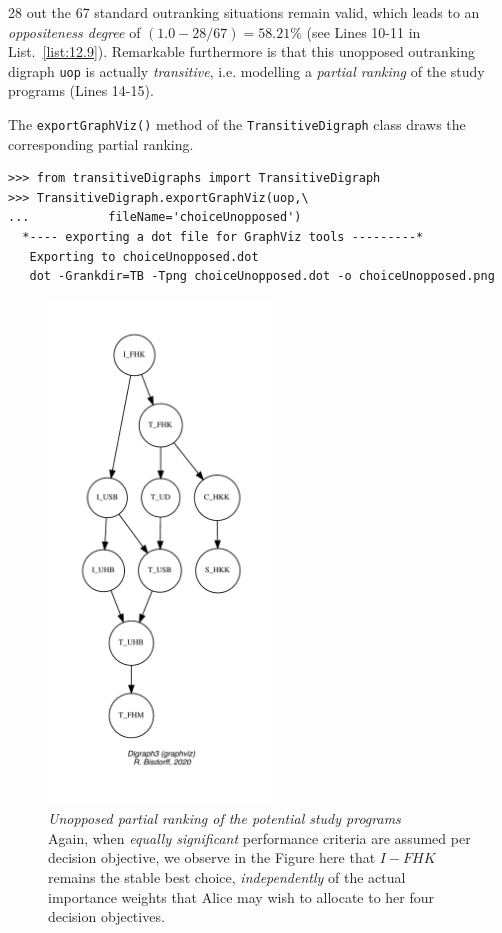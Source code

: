 28 out the 67 standard outranking situations remain valid, which leads to an \emph{oppositeness degree} of $(1.0 - 28/67) = 58.21\%$ (see Lines 10-11 in List.~\vref{list:12.9}). Remarkable furthermore is that this unopposed outranking digraph \texttt{uop} is actually \emph{transitive}, i.e. modelling a \emph{partial ranking} of the study programs (Lines 14-15).

The \texttt{exportGraphViz()} method of the \texttt{Transi\-tiveDigraph} class draws the corresponding partial ranking.
\begin{lstlisting}
>>> from transitiveDigraphs import TransitiveDigraph
>>> TransitiveDigraph.exportGraphViz(uop,\
...           fileName='choiceUnopposed')
  *---- exporting a dot file for GraphViz tools ---------*
   Exporting to choiceUnopposed.dot
   dot -Grankdir=TB -Tpng choiceUnopposed.dot -o choiceUnopposed.png
\end{lstlisting}
\begin{figure}[ht]
\sidecaption[t]
\includegraphics[width=6cm]{Figures/12-7-choiceUnopposed.pdf}
\caption[Unopposed partial ranking of the potential study programs]{\emph{Unopposed partial ranking of the potential study programs}\\ Again, when \emph{equally significant} performance criteria are assumed per decision objective, we observe in the Figure here that $I-FHK$ remains the stable best choice, \emph{independently} of the actual importance weights that Alice may wish to allocate to her four decision objectives.}
\label{fig:12.7}       %
\end{figure}

